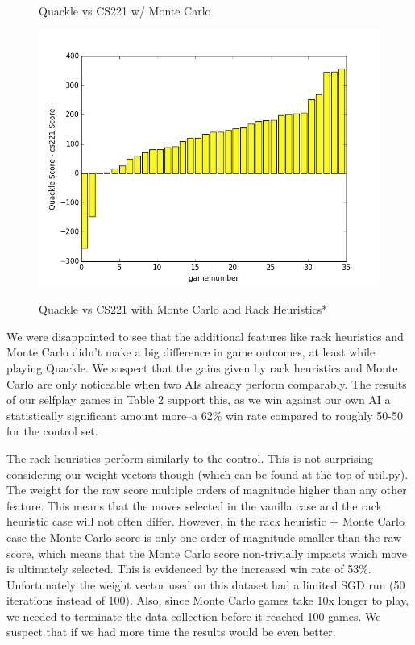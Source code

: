 \documentclass[12pt]{article}
\begin{document}
\begin{figure}[h!]
  \caption{\footnotesize{Quackle vs CS221 w/ Monte Carlo}}
  \endminipage
      \centering
  \includegraphics[scale=0.39]{../images/quacklegame_MC-RH_35}\\
   \caption{\footnotesize{Quackle vs CS221 with Monte Carlo and Rack
       Heuristics*}}
  \endminipage{}
\end{figure}

We were disappointed to see that the additional features like rack
heuristics and Monte Carlo didn't make a big difference in game
outcomes, at least while playing Quackle. We suspect that the gains
given by rack heuristics and Monte Carlo are only noticeable when two
AIs already perform comparably. The results of our selfplay games in
Table 2 support this, as we win against our own AI a statistically
significant amount more--a 62\% win rate compared to roughly 50-50 for
the control set.  

The rack heuristics perform similarly to the control. This is not
surprising considering our weight vectors though (which can be found
at the top of util.py). The weight for the raw score multiple orders
of magnitude higher than any other feature. This means that the moves
selected in the vanilla case and the rack heuristic case will not
often differ. However, in the rack heuristic + Monte Carlo case the
Monte Carlo score is only one order of magnitude smaller than the raw
score, which means that the Monte Carlo score non-trivially impacts
which move is ultimately selected. This is evidenced by the increased
win rate of 53\%. Unfortunately the weight vector used on this dataset
had a limited SGD run (50 iterations instead of 100). Also, since
Monte Carlo games take 10x longer to play, we needed to terminate the
data collection before it reached 100 games. We suspect that if we had
more time the results would be even better.
\end{document}
